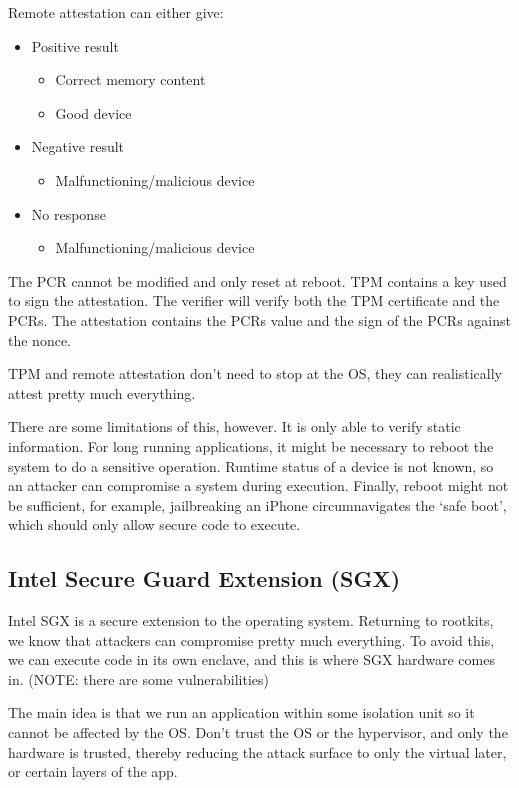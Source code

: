 \documentclass[11pt,a4paper,titlepage,dvipsnames,cmyk]{scrartcl}
\begin{document}
Remote attestation can either give:
\begin{itemize}
    \item Positive result
    \begin{itemize}
        \item Correct memory content
        \item Good device
    \end{itemize}
    \item Negative result
    \begin{itemize}
        \item Malfunctioning/malicious device
    \end{itemize}
    \item No response
    \begin{itemize}
        \item Malfunctioning/malicious device
    \end{itemize}
\end{itemize}

The PCR cannot be modified and only reset at reboot. TPM contains a key used to sign the attestation. The verifier will verify both the TPM certificate and the PCRs. The attestation contains the PCRs value and the sign of the PCRs against the nonce.

TPM and remote attestation don't need to stop at the OS, they can realistically attest pretty much everything.

There are some limitations of this, however. It is only able to verify static information. For long running applications, it might be necessary to reboot the system to do a sensitive operation. Runtime status of a device is not known, so an attacker can compromise a system during execution. Finally, reboot might not be sufficient, for example, jailbreaking an iPhone circumnavigates the `safe boot', which should only allow secure code to execute.

\subsection{Intel Secure Guard Extension (SGX)}
Intel SGX is a secure extension to the operating system. Returning to rootkits, we know that attackers can compromise pretty much everything. To avoid this, we can execute code in its own enclave, and this is where SGX hardware comes in. (NOTE: there are some vulnerabilities)

The main idea is that we run an application within some isolation unit so it cannot be affected by the OS. Don't trust the OS or the hypervisor, and only the hardware is trusted, thereby reducing the attack surface to only the virtual later, or certain layers of the app.
\end{document}
